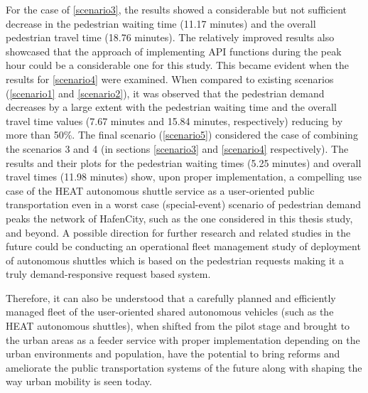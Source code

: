 For the case of \ref{scenario3}, the results showed a considerable but not sufficient decrease in the pedestrian waiting time (11.17 minutes) and the overall pedestrian travel time (18.76 minutes). The relatively improved results also showcased that the approach of implementing API functions during the peak hour could be a considerable one for this study. This became evident when the results for \ref{scenario4} were examined. When compared to existing scenarios (\ref{scenario1} and \ref{scenario2}), it was observed that the pedestrian demand decreases by a large extent with the pedestrian waiting time and the overall travel time values (7.67 minutes and 15.84 minutes, respectively) reducing by more than 50\%. The final scenario (\ref{scenario5}) considered the case of combining the scenarios 3 and 4 (in sections \ref{scenario3} and \ref{scenario4} respectively). The results and their plots for the pedestrian waiting times (5.25 minutes) and overall travel times (11.98 minutes) show, upon proper implementation, a compelling use case of the HEAT autonomous shuttle service as a user-oriented public transportation even in a worst case (special-event) scenario of pedestrian demand peaks the network of HafenCity, such as the one considered in this thesis study, and beyond. A possible direction for further research and related studies in the future could be conducting an operational fleet management study of deployment of autonomous shuttles which is based on the pedestrian requests making it a truly demand-responsive request based system.

Therefore, it can also be understood that a carefully planned and efficiently managed fleet of the user-oriented shared autonomous vehicles (such as the HEAT autonomous shuttles), when shifted from the pilot stage and brought to the urban areas as a feeder service with proper implementation depending on the urban environments and population, have the potential to bring reforms and ameliorate the public transportation systems of the future along with shaping the way urban mobility is seen today.


